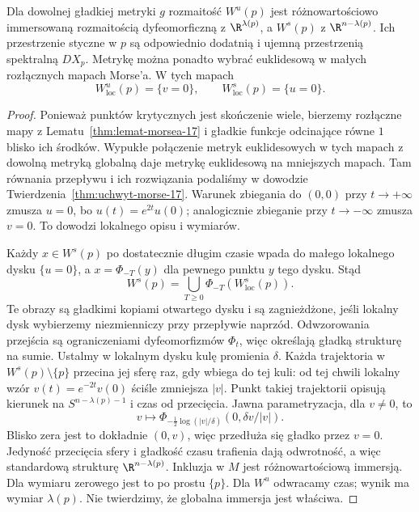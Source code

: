 \begin{twierdzenie}
\label{thm:stable-morse-17}
Dla dowolnej gładkiej metryki $g$ rozmaitość
$W^u(p)$ jest różnowartościowo
immersowaną rozmaitością
dyfeomorficzną z $\R^{\lambda(p)}$,
a $W^s(p)$ z $\R^{n-\lambda(p)}$.
Ich przestrzenie styczne w $p$ są odpowiednio
dodatnią i ujemną przestrzenią spektralną $DX_p$.
Metrykę można ponadto wybrać euklidesową
w małych rozłącznych mapach Morse'a. W tych mapach
\[
 W^u_{\mathrm{loc}}(p)=\{v=0\},
 \qquad
 W^s_{\mathrm{loc}}(p)=\{u=0\}.
\]
\end{twierdzenie}
\begin{proof}
Ponieważ punktów krytycznych
jest skończenie wiele, bierzemy
rozłączne mapy z
Lematu~\ref{thm:lemat-morsea-17}
i gładkie funkcje odcinające
równe $1$ blisko ich środków.
Wypukłe połączenie
metryk euklidesowych w tych
mapach z dowolną metryką
globalną daje metrykę
euklidesową na mniejszych mapach.
Tam równania przepływu
i ich rozwiązania podaliśmy
w dowodzie
Twierdzenia~\ref{thm:uchwyt-morse-17}.
Warunek zbiegania do $(0,0)$
przy $t\to+\infty$ zmusza $u=0$,
bo $u(t)=e^{2t}u(0)$;
analogicznie zbieganie
przy $t\to-\infty$ zmusza $v=0$.
To dowodzi lokalnego opisu
i wymiarów.

Każdy $x\in W^s(p)$
po dostatecznie długim czasie
wpada do małego lokalnego
dysku $\{u=0\}$, a
$x=\Phi_{-T}(y)$
dla pewnego punktu $y$
tego dysku. Stąd
\[
 W^s(p)=\bigcup_{T\geq0}
      \Phi_{-T}(W^s_{\mathrm{loc}}(p)).
\]
Te obrazy są gładkimi kopiami
otwartego dysku i są
zagnieżdżone, jeśli lokalny
dysk wybierzemy niezmienniczy
przy przepływie naprzód.
Odwzorowania przejścia są
ograniczeniami dyfeomorfizmów
$\Phi_t$, więc określają
gładką strukturę na sumie.
Ustalmy w lokalnym dysku
kulę promienia $\delta$.
Każda trajektoria w
$W^s(p)\setminus\{p\}$
przecina jej sferę raz, gdy
wbiega do tej kuli: od tej
chwili lokalny wzór
$v(t)=e^{-2t}v(0)$
ściśle zmniejsza $|v|$.
Punkt takiej trajektorii
opisują kierunek na
$S^{n-\lambda(p)-1}$
i czas od przecięcia.
Jawna parametryzacja, dla $v\ne0$, to
\[
 v\longmapsto
 \Phi_{-\frac12\log(|v|/\delta)}
          (0,\delta v/|v|).
\]
Blisko zera jest to dokładnie $(0,v)$,
więc przedłuża się gładko przez $v=0$.
Jedyność przecięcia sfery i gładkość czasu trafienia
dają odwrotność, a więc standardową
strukturę $\R^{n-\lambda(p)}$.
Inkluzja w $M$ jest
różnowartościową immersją.
Dla wymiaru zerowego
jest to po prostu $\{p\}$.
Dla $W^u$ odwracamy czas;
wynik ma wymiar $\lambda(p)$.
Nie twierdzimy, że globalna
immersja jest właściwa.


\end{proof}
